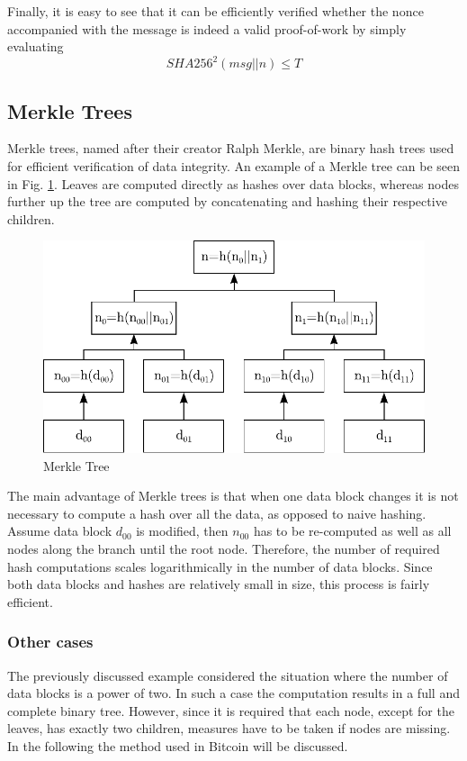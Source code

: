 \noindent
Finally, it is easy to see that it can be efficiently verified whether the nonce accompanied with the message is indeed a valid proof-of-work by simply evaluating
\begin{equation}
SHA256^{2}(msg||n) \leq T
\end{equation}


\subsection{Merkle Trees} \label{sec:MerkleTrees}
Merkle trees, named after their creator Ralph Merkle, are binary hash trees used for efficient verification of data integrity. An example of a Merkle tree can be seen in Fig. \ref{fig:MerkleTree}. Leaves are computed directly as hashes over data blocks, whereas nodes further up the tree are computed by concatenating and hashing their respective children.

\begin{figure}[htbp]
 \centering
 \includegraphics[scale=0.75]{images/MerkleTree.pdf}
 \caption{Merkle Tree}
 \label{fig:MerkleTree}
\end{figure}
\vspace{-10pt}

\noindent
The main advantage of Merkle trees is that when one data block changes it is not necessary to compute a hash over all the data, as opposed to naive hashing. Assume data block $\mathit{d_{00}}$ is modified, then $\mathit{n_{00}}$ has to be re-computed as well as all nodes along the branch until the root node. Therefore, the number of required hash computations scales logarithmically in the number of data blocks. Since both data blocks and hashes are relatively small in size, this process is fairly efficient.

\subsubsection*{Other cases}
The previously discussed example considered the situation where the number of data blocks is a power of two. In such a case the computation results in a full and complete binary tree. However, since it is required that each node, except for the leaves, has exactly two children, measures have to be taken if nodes are missing. In the following the method used in Bitcoin will be discussed.~\\

